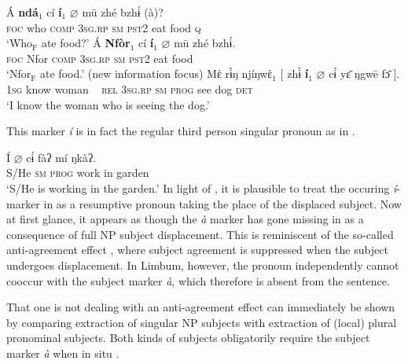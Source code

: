 \documentclass[output=paper]{langscibook}
\begin{document}
\ea \label{ex:johanneshein:AAE-Limbum}
\begin{xlist}
\ex \label{ex:johanneshein:AAE-Limbum-wh}
\gll Á \textbf{ndá}$_1$ cí \textbf{í$_1$} $\varnothing$ mū zhé bzhɨ́ (à)?\\
\textsc{foc} who \textsc{comp} \textsc{3sg.rp} \textsc{sm} \textsc{pst2} eat food \textsc{q}\\
\glt `Who$_{\text{F}}$ ate food?'
\ex \label{ex:johanneshein:AAE-Limbum-NP}
\gll Á \textbf{Nfòr}$_1$ cí \textbf{í$_1$} $\varnothing$ mū zhé bzhɨ́.\\
\textsc{foc} Nfor \textsc{comp} \textsc{3sg.rp} \textsc{sm} \textsc{pst2} eat food\\
\glt `Nfor$_{\text{F}}$ ate food.' (new information focus)
\ex \label{ex:johanneshein:AAE-Limbum-REL}
\gll Mὲ rɨ̀ŋ njíŋwὲ$_1$ [ zhɨ̀ \textbf{í$_1$} $\varnothing$ cɨ́ yɛ̄ ŋgwē fɔ̄ ].\\
\textsc{1sg} know woman ~ \textsc{rel} \textsc{3sg.rp} \textsc{sm} \textsc{prog} see dog \textsc{det}\\
\glt `I know the woman who is seeing the dog.'
\end{xlist}
\z 
This marker \textit{í} is in fact the regular third person singular pronoun as in . 

\ea \label{ex:johanneshein:PRON}
\gll Í $\varnothing$ cɨ́ fàʔ mí ŋkàʔ.\\
S/He \textsc{sm} \textsc{prog} work in garden\\
\glt `S/He is working in the garden.'
\z
In light of , it is plausible to treat the occuring
\textit{í}-marker in  as a resumptive pronoun taking the place
of the displaced subject. Now at first glance, it appears as though
the \textit{à} marker has gone missing in  as a consequence of
full NP subject displacement. This is reminiscent of the so-called
anti-agreement effect \citep{ouhalla93,baier18}, where subject
agreement is suppressed when the subject undergoes displacement. In
Limbum, however, the pronoun independently cannot cooccur with the
subject marker \textit{à}, which therefore is absent from the
sentence.

That one is not dealing with an anti-agreement effect can immediately
be shown by comparing extraction of singular NP subjects with
extraction of (local) plural pronominal subjects. Both kinds of
subjects obligatorily require the subject marker \textit{à} when in
situ .
\end{document}
